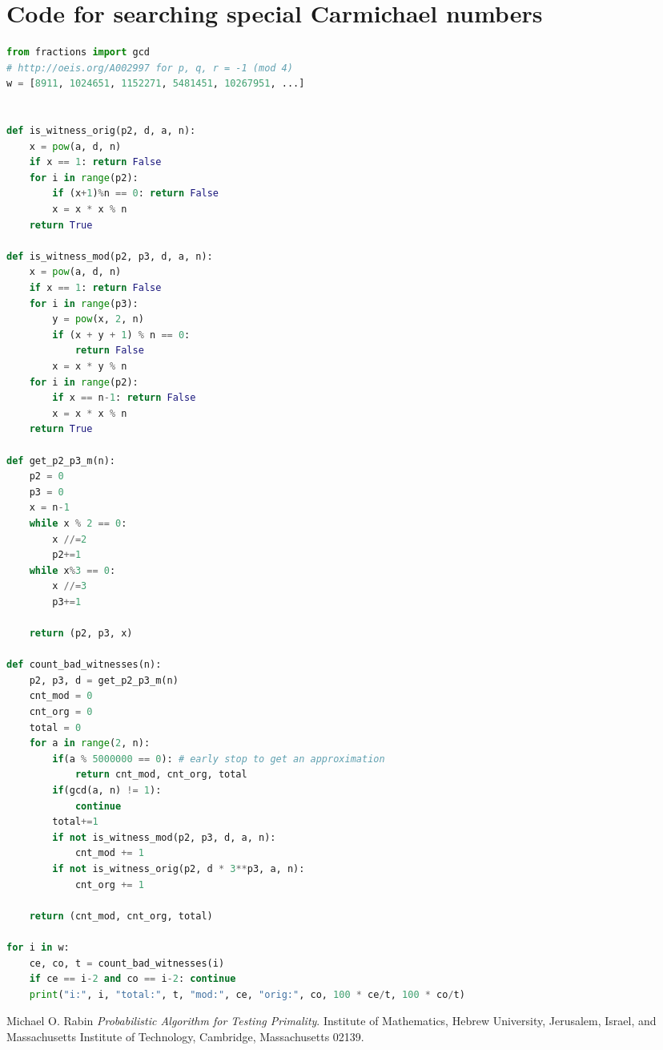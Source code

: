 \documentclass[11pt]{llncs}
\begin{document}
\section{Code for searching special Carmichael numbers}
\scriptsize
\begin{lstlisting}[basicstyle=\ttfamily,language=Python,showstringspaces=false]
from fractions import gcd
# http://oeis.org/A002997 for p, q, r = -1 (mod 4)
w = [8911, 1024651, 1152271, 5481451, 10267951, ...]


def is_witness_orig(p2, d, a, n):
    x = pow(a, d, n)
    if x == 1: return False
    for i in range(p2):
        if (x+1)%n == 0: return False
        x = x * x % n
    return True

def is_witness_mod(p2, p3, d, a, n):
    x = pow(a, d, n)
    if x == 1: return False
    for i in range(p3):
        y = pow(x, 2, n)
        if (x + y + 1) % n == 0:
            return False
        x = x * y % n
    for i in range(p2):
        if x == n-1: return False
        x = x * x % n
    return True

def get_p2_p3_m(n):
    p2 = 0
    p3 = 0
    x = n-1
    while x % 2 == 0:
        x //=2
        p2+=1
    while x%3 == 0:
        x //=3
        p3+=1
    
    return (p2, p3, x)

def count_bad_witnesses(n):
    p2, p3, d = get_p2_p3_m(n)
    cnt_mod = 0
    cnt_org = 0
    total = 0
    for a in range(2, n):
        if(a % 5000000 == 0): # early stop to get an approximation
            return cnt_mod, cnt_org, total
        if(gcd(a, n) != 1):
            continue
        total+=1
        if not is_witness_mod(p2, p3, d, a, n):
            cnt_mod += 1
        if not is_witness_orig(p2, d * 3**p3, a, n):
            cnt_org += 1

    return (cnt_mod, cnt_org, total)

for i in w:
    ce, co, t = count_bad_witnesses(i)
    if ce == i-2 and co == i-2: continue
    print("i:", i, "total:", t, "mod:", ce, "orig:", co, 100 * ce/t, 100 * co/t)
\end{lstlisting}
\normalsize
\medskip
\begin{thebibliography}{9}
Michael O. Rabin
\textit{Probabilistic Algorithm for Testing Primality}.
Institute of Mathematics, Hebrew University, Jerusalem, Israel, and Massachusetts Institute of Technology, Cambridge, Massachusetts 02139.
\end{thebibliography}
\end{document}
